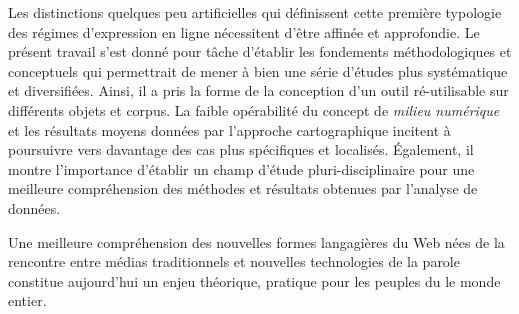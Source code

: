 Les distinctions quelques peu artificielles qui définissent cette première typologie des régimes d'expression en ligne nécessitent d'être affinée et approfondie. Le présent travail s'est donné pour tâche d'établir les fondements méthodologiques et conceptuels qui permettrait de mener à bien une série d'études plus systématique et diversifiées. Ainsi, il a pris la forme de la conception d'un outil ré-utilisable sur différents objets et corpus. La faible opérabilité du concept de \textit{milieu numérique} et les résultats moyens données par l'approche cartographique incitent à poursuivre vers davantage des cas plus spécifiques et localisés. \'Egalement, il montre l'importance d'établir un champ d'étude pluri-disciplinaire pour une meilleure compréhension des méthodes et résultats obtenues par l'analyse de données. 


Une meilleure compréhension des nouvelles formes langagières du Web nées de la rencontre entre médias traditionnels et nouvelles technologies de la parole constitue aujourd'hui un enjeu théorique, pratique pour les peuples du le monde entier. 